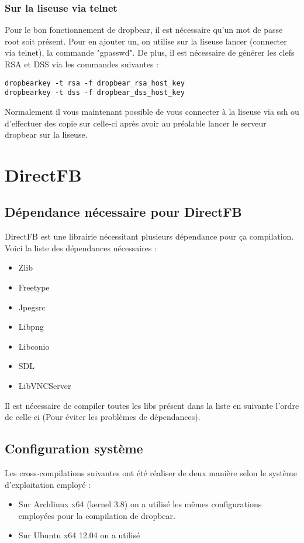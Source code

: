 \subsubsection{Sur la liseuse via telnet}

Pour le bon fonctionnement de dropbear, il est nécessaire qu'un mot de passe root soit présent. Pour en ajouter un, on utilise sur la liseuse lancer (connecter via telnet), la commande "gpasswd".
De plus, il est nécessaire de générer les clefs RSA et DSS via les commandes suivantes :

\begin{lstlisting}
dropbearkey -t rsa -f dropbear_rsa_host_key
dropbearkey -t dss -f dropbear_dss_host_key
\end{lstlisting}

Normalement il vous maintenant possible de vous connecter à la liseuse via ssh ou d'effectuer des copie sur celle-ci après avoir au préalable lancer le serveur dropbear sur la liseuse.

\section{DirectFB}

\subsection{Dépendance nécessaire pour DirectFB}

DirectFB est une librairie nécessitant plusieurs dépendance pour ça compilation. Voici la liste des dépendances nécessaires :

\begin{itemize}
\item Zlib
\item Freetype
\item Jpegsrc
\item Libpng
\item Libconio
\item SDL
\item LibVNCServer
\end{itemize}

Il est nécessaire de compiler toutes les libs présent dans la liste en suivante l'ordre de celle-ci (Pour éviter les problèmes de dépendances).

\subsection{Configuration système}
Les cross-compilations suivantes ont été réaliser de deux manière selon le système d'exploitation employé : 

\begin{itemize}
\item Sur Archlinux x64 (kernel 3.8) on a utilisé les mêmes configurations employées pour la compilation de dropbear.
\item Sur Ubuntu x64 12.04 on a utilisé 
\end{itemize}